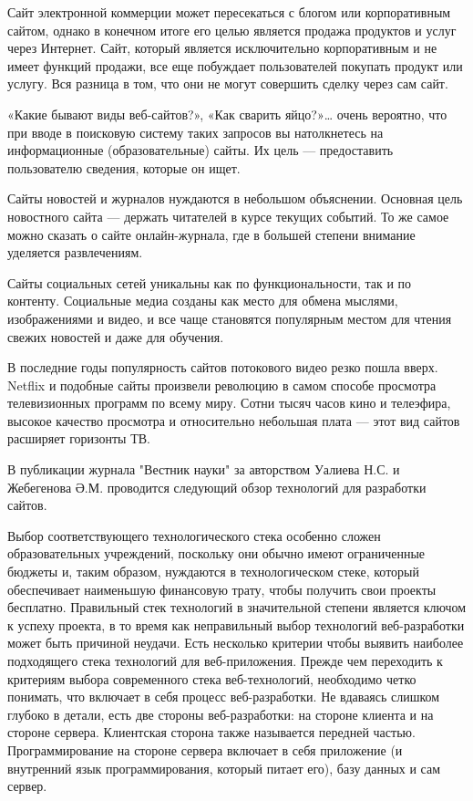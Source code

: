 Сайт электронной коммерции может пересекаться с блогом или корпоративным сайтом, однако в конечном итоге его целью является продажа продуктов и услуг через Интернет.
Сайт, который является исключительно корпоративным и не имеет функций продажи, все еще побуждает пользователей покупать продукт или услугу.
Вся разница в том, что они не могут совершить сделку через сам сайт.

«Какие бывают виды веб-сайтов?», «Как сварить яйцо?»… очень вероятно, что при вводе в поисковую систему таких запросов вы натолкнетесь на информационные (образовательные) сайты.
Их цель — предоставить пользователю сведения, которые он ищет.

Сайты новостей и журналов нуждаются в небольшом объяснении.
Основная цель новостного сайта — держать читателей в курсе текущих событий.
То же самое можно сказать о сайте онлайн-журнала, где в большей степени внимание уделяется развлечениям.

Сайты социальных сетей уникальны как по функциональности, так и по контенту.
Социальные медиа созданы как место для обмена мыслями, изображениями и видео, и все чаще становятся популярным местом для чтения свежих новостей и даже для обучения.

В последние годы популярность сайтов потокового видео резко пошла вверх.
Netflix и подобные сайты произвели революцию в самом способе просмотра телевизионных программ по всему миру.
Сотни тысяч часов кино и телеэфира, высокое качество просмотра и относительно небольшая плата — этот вид сайтов расширяет горизонты ТВ.

В публикации журнала "Вестник науки" за авторством Уалиева Н.С. и Жебегенова Ә.М. \cite{ualiev-jebegenov-issledovanie} проводится следующий обзор технологий для разработки сайтов.

Выбор соответствующего технологического стека особенно сложен образовательных учреждений, поскольку они обычно имеют ограниченные бюджеты и, таким образом, нуждаются в технологическом стеке, который обеспечивает наименьшую финансовую трату, чтобы получить свои проекты бесплатно.
Правильный стек технологий в значительной степени является ключом к успеху проекта, в то время как неправильный выбор технологий веб-разработки может быть причиной неудачи.
Есть несколько критерии чтобы выявить наиболее подходящего стека технологий для веб-приложения.
Прежде чем переходить к критериям выбора современного стека веб-технологий, необходимо четко понимать, что включает в себя процесс веб-разработки.
Не вдаваясь слишком глубоко в детали, есть две стороны веб-разработки: на стороне клиента и на стороне сервера.
Клиентская сторона также называется передней частью.
Программирование на стороне сервера включает в себя приложение (и внутренний язык программирования, который питает его), базу данных и сам сервер.


